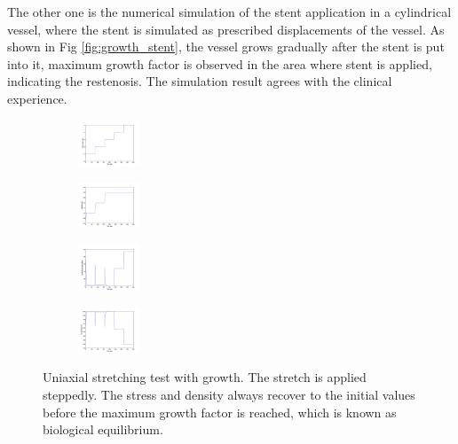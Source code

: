 \documentclass[12pt]{article}
\begin{document}
The other one is the numerical simulation of the stent application in a cylindrical vessel, where the stent is simulated as prescribed displacements of the vessel. As shown in Fig \ref{fig:growth_stent}, the vessel grows gradually after the stent is put into it, maximum growth factor is observed in the area where stent is applied, indicating the restenosis. The simulation result agrees with the clinical experience.

\begin{figure}[H]
	\centering
	\begin{subfigure}
		\centering
		\includegraphics[width=0.2\textwidth]{./figs/stretch1.jpg}
	\end{subfigure}
	\begin{subfigure}
		\centering
		\includegraphics[width=0.2\textwidth]{./figs/stretch2.jpg}
	\end{subfigure}
	\begin{subfigure}
		\centering
		\includegraphics[width=0.2\textwidth]{./figs/stretch3.jpg}
	\end{subfigure}
	\begin{subfigure}
		\centering
		\includegraphics[width=0.2\textwidth]{./figs/stretch4.jpg}
	\end{subfigure}
	\caption{Uniaxial stretching test with growth. The stretch is applied steppedly. The stress and density always recover to the initial values before the maximum growth factor is reached, which is known as biological equilibrium.}
	\label{fig:growth_results}
\end{figure}
\end{document}
